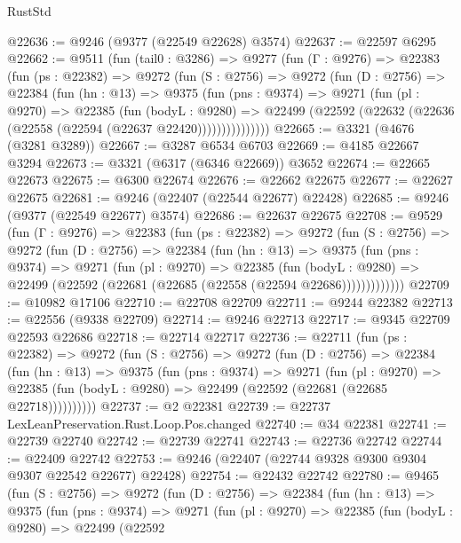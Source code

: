 \begin{lexlean}{RustStd}
\begin{coremodule}
{\begin{coremodule}
{{{{{{{{{{{{{{{{{{{{{{{{{{{{{{{{{@22636 := @9246 (@9377 (@22549 @22628) @3574)
@22637 := @22597 @6295
@22662 := @9511
    (fun (tail0 : @3286) =>
    @9277
      (fun (Γ : @9276) =>
      @22383
        (fun (ps : @22382) =>
        @9272
          (fun (S : @2756) =>
          @9272
            (fun (D : @2756) =>
            @22384
              (fun (hn : @13) =>
              @9375
                (fun (pns : @9374) =>
                @9271
                  (fun (pl : @9270) =>
                  @22385
                    (fun (bodyL : @9280) =>
                    @22499 (@22592 (@22632 (@22636 (@22558 (@22594 (@22637 @22420)))))))))))))))
@22665 := @3321 (@4676 (@3281 @3289))
@22667 := @3287 @6534 @6703
@22669 := @4185 @22667 @3294
@22673 := @3321 (@6317 (@6346 @22669)) @3652
@22674 := @22665 @22673
@22675 := @6300 @22674
@22676 := @22662 @22675
@22677 := @22627 @22675
@22681 := @9246 (@22407 (@22544 @22677) @22428)
@22685 := @9246 (@9377 (@22549 @22677) @3574)
@22686 := @22637 @22675
@22708 := @9529
    (fun (Γ : @9276) =>
    @22383
      (fun (ps : @22382) =>
      @9272
        (fun (S : @2756) =>
        @9272
          (fun (D : @2756) =>
          @22384
            (fun (hn : @13) =>
            @9375
              (fun (pns : @9374) =>
              @9271
                (fun (pl : @9270) =>
                @22385
                  (fun (bodyL : @9280) =>
                  @22499 (@22592 (@22681 (@22685 (@22558 (@22594 @22686)))))))))))))
@22709 := @10982 @17106
@22710 := @22708 @22709
@22711 := @9244 @22382
@22713 := @22556 (@9338 @22709)
@22714 := @9246 @22713
@22717 := @9345 @22709 @22593 @22686
@22718 := @22714 @22717
@22736 := @22711
    (fun (ps : @22382) =>
    @9272
      (fun (S : @2756) =>
      @9272
        (fun (D : @2756) =>
        @22384
          (fun (hn : @13) =>
          @9375
            (fun (pns : @9374) =>
            @9271
              (fun (pl : @9270) =>
              @22385 (fun (bodyL : @9280) => @22499 (@22592 (@22681 (@22685 @22718))))))))))
@22737 := @2 @22381
@22739 := @22737 LexLeanPreservation.Rust.Loop.Pos.changed
@22740 := @34 @22381
@22741 := @22739 @22740
@22742 := @22739 @22741
@22743 := @22736 @22742
@22744 := @22409 @22742
@22753 := @9246 (@22407 (@22744 @9328 @9300 @9304 @9307 @22542 @22677) @22428)
@22754 := @22432 @22742
@22780 := @9465
    (fun (S : @2756) =>
    @9272
      (fun (D : @2756) =>
      @22384
        (fun (hn : @13) =>
        @9375
          (fun (pns : @9374) =>
          @9271
            (fun (pl : @9270) =>
            @22385
              (fun (bodyL : @9280) =>
              @22499
                (@22592
}}}}}}}}}}}}}}}}}}}}}}}}}}}}}}}}}
\end{coremodule}}
\end{coremodule}
\end{lexlean}

